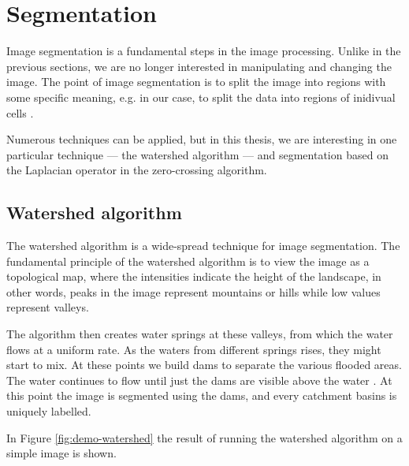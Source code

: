 \documentclass[
  digital,     %
  oneside,     %
  nosansbold,  %
  nocolorbold, %
  lof,         %
  lot,         %
]{fithesis4}
\begin{document}
\section{Segmentation}

Image segmentation is a fundamental steps in the image processing. Unlike in the
previous sections, we are no longer interested in manipulating and changing the
image. The point of image segmentation is to split the image into regions with
some specific meaning, e.g. in our case, to split the data into regions of
inidivual cells \cite{gonzalez2002}.

Numerous techniques can be applied, but in this thesis, we are interesting in
one particular technique --- the watershed algorithm --- and segmentation based
on the Laplacian operator in the zero-crossing algorithm.

\subsection{Watershed algorithm}

The watershed algorithm is a wide-spread technique for image segmentation. The
fundamental principle of the watershed algorithm is to view the image as a
topological map, where the intensities indicate the height of the landscape, in
other words, peaks in the image represent mountains or hills while low values
represent valleys.

The algorithm then creates water springs at these valleys, from which the water
flows at a uniform rate. As the waters from different springs rises, they might
start to mix. At these points we build dams to separate the various flooded
areas. The water continues to flow until just the dams are visible above the
water \cite{gonzalez2002}. At this point the image is segmented using the dams,
and every catchment basins is uniquely labelled.

In Figure \ref{fig:demo-watershed} the result of running the watershed algorithm 
on a simple image is shown.
\end{document}
